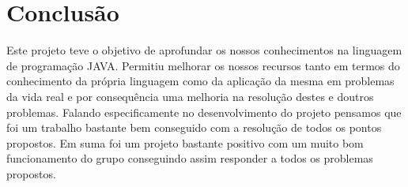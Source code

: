 \documentclass[a4paper]{article}
\begin{document}
			


			
\section{Conclusão}
\label{sec:conclusao}

Este projeto teve o objetivo de aprofundar os nossos conhecimentos na linguagem de programação JAVA. Permitiu melhorar os nossos recursos tanto em termos do conhecimento da própria linguagem como da aplicação da mesma em problemas da vida real e por consequência uma melhoria na resolução destes e doutros problemas.
Falando especificamente no desenvolvimento do projeto pensamos que foi um trabalho bastante bem conseguido com a resolução de todos os pontos propostos. Em suma foi um projeto bastante positivo com um muito bom funcionamento do grupo conseguindo assim responder a todos os problemas propostos.
\end{document}

